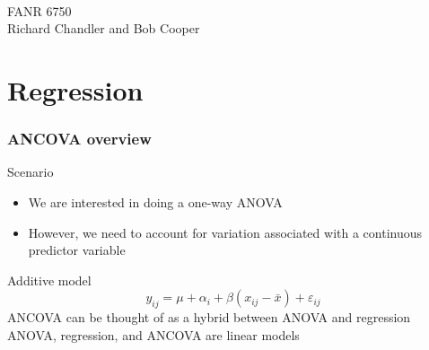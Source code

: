 \documentclass[color=usenames,dvipsnames]{beamer}\usepackage[]{graphicx}\usepackage[]{color}
\begin{document}



\begin{frame}[plain]
  \huge
  \centering \par
  {\color{RoyalBlue}{Lab 11 -- ANCOVA}} \\
  \vspace{1cm}
  \Large
  FANR 6750 \\
  \vfill
  \large
  Richard Chandler and Bob Cooper
\end{frame}



\section{Regression}




\begin{frame}
  \frametitle{ANCOVA overview}
  {%
    Scenario}
  \begin{itemize}
    \item We are interested in doing a one-way ANOVA
    \item However, we need to account for variation associated with a
      continuous predictor variable
  \end{itemize}
  \pause
  \vfill
  {%
    Additive model}
  \[
    y_{ij} = \mu + \alpha_i + \beta(x_{ij} - \bar{x}) + \varepsilon_{ij}
  \]
  \pause
  \vfill
  ANCOVA can be thought of as a hybrid between ANOVA and regression \\
  \pause
  \vfill
  ANOVA, regression, and ANCOVA are linear models \\
\end{frame}
\end{document}
